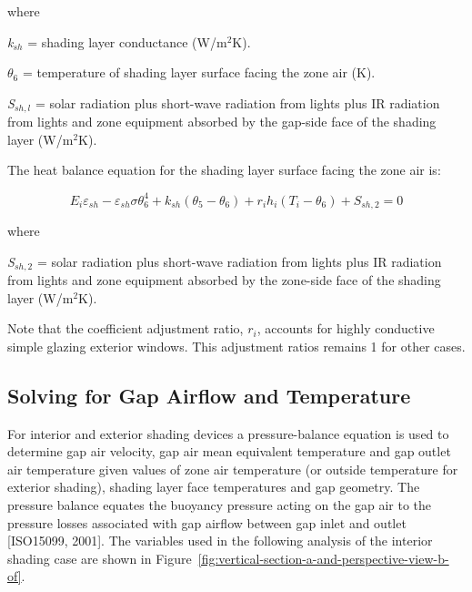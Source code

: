 where

\emph{k\(_{sh}\)} = shading layer conductance (W/m\(^{2}\)K).

\emph{$\theta$\(_{6}\)} = temperature of shading layer surface facing the zone air (K).

\emph{S\(_{sh,l}\)} = solar radiation plus short-wave radiation from lights plus IR radiation from lights and zone equipment absorbed by the gap-side face of the shading layer (W/m\(^{2}\)K).

The heat balance equation for the shading layer surface facing the zone air is:

\begin{equation}
{E_i}{\varepsilon_{sh}} - {\varepsilon_{sh}}\sigma \theta_6^4 + {k_{sh}}\left( {{\theta_5} - {\theta_6}} \right) + {r_i}{h_i}\left( {{T_i} - {\theta_6}} \right) + {S_{sh,2}} = 0
\end{equation}

where

\emph{S\(_{sh,2}\)} = solar radiation plus short-wave radiation from lights plus IR radiation from lights and zone equipment absorbed by the zone-side face of the shading layer (W/m\(^{2}\)K).

Note that the coefficient adjustment ratio, \({r_i}\), accounts for highly conductive simple glazing exterior windows. This adjustment ratios remains 1 for other cases.

\subsection{Solving for Gap Airflow and Temperature}\label{solving-for-gap-airflow-and-temperature}

For interior and exterior shading devices a pressure-balance equation is used to determine gap air velocity, gap air mean equivalent temperature and gap outlet air temperature given values of zone air temperature (or outside temperature for exterior shading), shading layer face temperatures and gap geometry. The pressure balance equates the buoyancy pressure acting on the gap air to the pressure losses associated with gap airflow between gap inlet and outlet {[}ISO15099, 2001{]}. The variables used in the following analysis of the interior shading case are shown in Figure~\ref{fig:vertical-section-a-and-perspective-view-b-of}.

